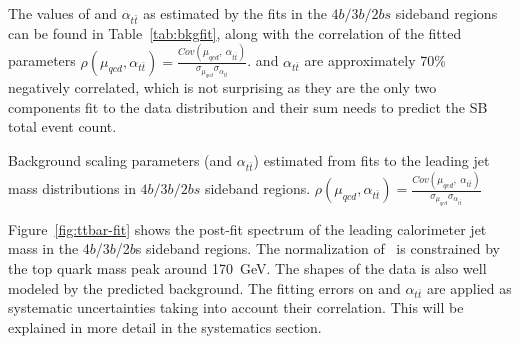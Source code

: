 The values of \muqcd and $\alpha_{t\bar{t}}$ as estimated by the fits in the $4b/3b/2bs$ sideband regions can be found in Table~\ref{tab:bkgfit}, along with the correlation of the fitted parameters $\rho(\mu_{qcd},\alpha_{t\bar{t}}) = \frac{Cov(\mu_{qcd},\ \alpha_{t\bar{t}})}{\sigma_{\mu_{qcd}}\sigma_{\alpha_{t\bar{t}}} }$. \muqcd and $\alpha_{t\bar{t}}$ are approximately 70\% negatively correlated, which is not surprising as they are the only two components fit to the data distribution and their sum needs to predict the SB total event count.

\begin{table}[htbp!]
\begin{center}

\caption{Background scaling parameters (\muqcd and $\alpha_{t\bar{t}}$) estimated from fits to the leading jet mass distributions in $4b/3b/2bs$ sideband regions. $\rho(\mu_{qcd},\alpha_{t\bar{t}}) = \frac{Cov(\mu_{qcd},\ \alpha_{t\bar{t}})}{\sigma_{\mu_{qcd}}\sigma_{\alpha_{t\bar{t}}} }$}
\label{tab:bkgfit}
\end{center}
\end{table}

Figure~\ref{fig:ttbar-fit} shows the post-fit spectrum of the leading \largeR calorimeter jet mass in the 4$b$/3$b$/2$b$s sideband regions. The normalization of \ttbar\ is 
constrained by the top quark mass peak around 170~GeV. The shapes of the data is also well modeled by the predicted background. The fitting errors on \muqcd and 
$\alpha_{t\bar{t}}$ are applied as systematic uncertainties taking into account their correlation. This will be explained in more detail in the systematics section.

